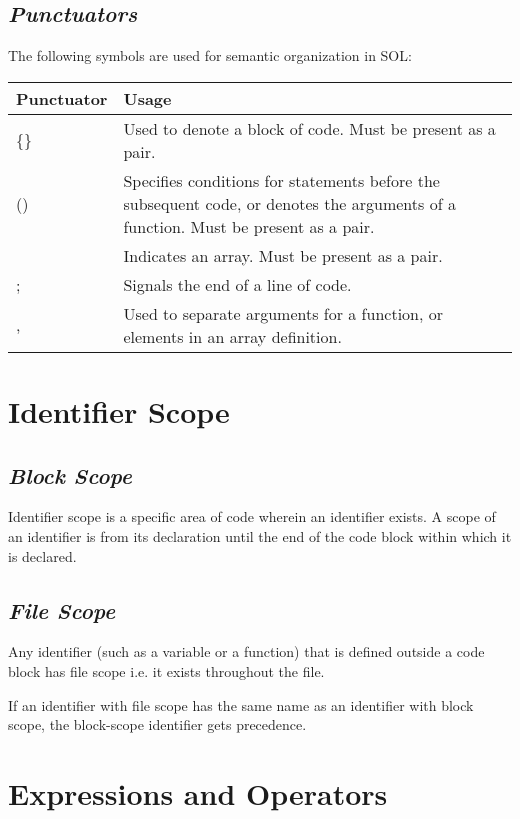 \documentclass[letterpaper,12pt]{article}
\begin{document}
	\subsection{\textit{Punctuators}}
	The following symbols are used for semantic organization in SOL:
	     \begin{center}
	     	\begin{tabular}{ |p{0.25\hsize}|p{0.75\hsize}| }
	     		\hline
	     		\textbf{Punctuator} & \textbf{Usage} \\
	     		\hline
	     		\{\}			& Used to denote a block of code. Must be present as a pair. \\
	     		()				& Specifies conditions for statements before the subsequent code, or denotes the arguments of a function. Must be present as a pair. \\
	     		\lbrack\rbrack	& Indicates an array. Must be present as a pair. \\
	     		;				& Signals the end of a line of code. \\
	     		,				& Used to separate arguments for a function, or elements in an array definition. \\
	     		\hline
	     	\end{tabular}
	     \end{center}
	
\section{Identifier Scope}
	\subsection{\textit{Block Scope}}
	Identifier scope is a specific area of code wherein an identifier exists. A scope of an identifier is from its declaration until the end of the code block within which it is declared.
	
	\subsection{\textit{File Scope}}
	Any identifier (such as a variable or a function) that is defined outside a code block has file scope i.e. it exists throughout the file.

	If an identifier with file scope has the same name as an identifier with block scope, the block-scope identifier gets precedence.

\section{Expressions and Operators}
\end{document}
